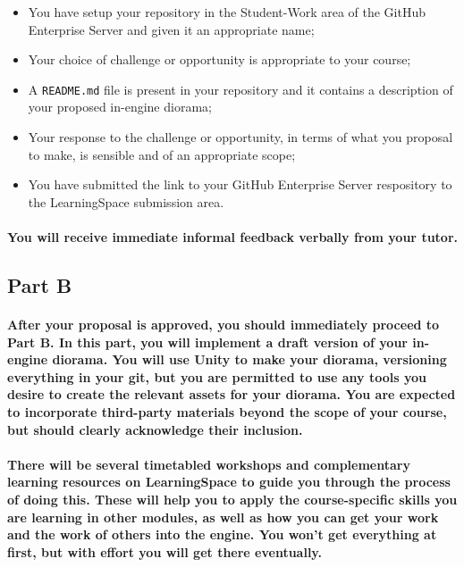 \documentclass{../../fal_assignment}
\begin{document}
\begin{itemize}
	\item You have setup your repository in the Student-Work area of the GitHub Enterprise Server and given it an appropriate name;
	\item Your choice of challenge or opportunity is appropriate to your course;
	\item A \texttt{README.md} file is present in your repository and it contains a description of your proposed in-engine diorama;
	\item Your response to the challenge or opportunity, in terms of what you proposal to make, is sensible and of an appropriate scope;
	\item You have submitted the link to your GitHub Enterprise Server respository to the LearningSpace submission area.
\end{itemize}

\paragraph{You will receive immediate \textbf{informal feedback} verbally from your \textbf{tutor}.}

\subsection*{Part B}

\paragraph{After your proposal is approved, you should immediately proceed to Part B. In this part, you will implement a draft version of your in-engine diorama. You will use Unity to make your diorama, versioning everything in your git, but you are permitted to use any tools you desire to create the relevant assets for your diorama. You are expected to incorporate third-party materials beyond the scope of your course, but should clearly acknowledge their inclusion.}

\paragraph{There will be several timetabled workshops and complementary learning resources on LearningSpace to guide you through the process of doing this. These will help you to apply the course-specific skills you are learning in other modules, as well as how you can get your work and the work of others into the engine. You won't get everything at first, but with effort you will get there eventually.}
\end{document}
